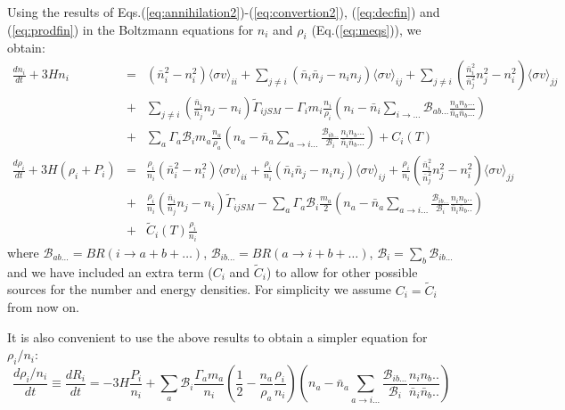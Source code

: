 \documentclass[preprint,notoc]{JHEP3}
\def\to{\rightarrow}
\def\to{\rightarrow}
\newcommand\Drv[2]{\frac{d #1}{d #2}}
\begin{document}
Using the results of Eqs.(\ref{eq:annihilation2})-(\ref{eq:convertion2}), (\ref{eq:decfin}) and
(\ref{eq:prodfin}) in the Boltzmann equations for $n_i$ and $\rho_i$
(Eq.(\ref{eq:meqs})), we obtain:
\begin{eqnarray}
\Drv{n_i}{t} + 3H n_i  & = &  \left( \bar{n}_i^2 - n_i^2 \right) \langle \sigma
v \rangle_{ii} + \sum_{j\neq i} \left( \bar{n}_i \bar{n}_j - n_i n_j \right) \langle \sigma
v \rangle_{ij} + \sum_{j\neq i} \left(\frac{\bar{n}_i^2}{\bar{n}_j^2} n_j^2  - n_i^2 \right) \langle \sigma v \rangle_{jj} \nonumber
\\
& + & \sum_{j\neq i} \left(\frac{\bar{n}_i}{\bar{n}_j} n_j  - n_i\right)  \tilde{\Gamma}_{ijSM} - \Gamma_i m_i \frac{n_i}{\rho_i}\left(n_i - \bar{n}_i \sum_{i\to\ldots}
\mathcal{B}_{ab\ldots} \frac{n_a n_b \ldots}{\bar{n}_a \bar{n}_b \ldots} \right)
\nonumber
\\
& + & \sum_a 
\Gamma_a \mathcal{B}_i m_a \frac{n_a}{\rho_a} \left(n_a - \bar{n}_a \sum_{a \to
i\ldots} \frac{\mathcal{B}_{ib\ldots}}{\mathcal{B}_{i}} \frac{n_i n_b \ldots}{\bar{n}_i \bar{n}_b \ldots} \right)  + C_{i}(T) \label{eq:nieq} \\
\Drv{\rho_i}{t} + 3H (\rho_i + P_i) & = & \frac{\rho_i}{n_i} \left( \bar{n}_i^2 - n_i^2 \right) \langle \sigma
v \rangle_{ii} + \frac{\rho_i}{n_i}  \left( \bar{n}_i \bar{n}_j - n_i n_j \right) \langle \sigma
v \rangle_{ij} + \frac{\rho_i}{n_i} \left(\frac{\bar{n}_i^2}{\bar{n}_j^2} n_j^2  - n_i^2 \right) \langle \sigma v \rangle_{jj} \nonumber
\\
& + &\frac{\rho_i}{n_i}  \left(\frac{\bar{n}_i}{\bar{n}_j} n_j  - n_i\right)  \tilde{\Gamma}_{ijSM} - \sum_a \Gamma_a  \mathcal{B}_i \frac{m_a}{2} \left( n_a -
 \bar{n}_a \sum_{a \to i\ldots}  \frac{\mathcal{B}_{ib\ldots}}{\mathcal{B}_{i}} \frac{n_i
 n_b..}{\bar{n}_i \bar{n}_b..} \right) \nonumber
\\
& + & \tilde{C}_{i}(T)
 \frac{\rho_i}{n_i}
\end{eqnarray}
where $\mathcal{B}_{ab\ldots} = BR(i \to a + b+ \ldots)$, $\mathcal{B}_{ib\ldots} =
BR(a \to i + b + \ldots)$, $\mathcal{B}_i = \sum_b \mathcal{B}_{ib\ldots}$ and
we have included an extra term ($C_i$ and $\tilde{C}_i$) to allow for other possible sources for the number and energy densities. 
For simplicity we assume $C_i = \tilde{C}_{i}$ from now on.


It is also convenient to use the above results to obtain a simpler equation for
$\rho_i/n_i$:
\begin{equation}
\Drv{\rho_i/n_i}{t} \equiv \Drv{R_i}{t} = -3 H \frac{P_i}{n_i} + \sum_{a}
\mathcal{B}_{i} \frac{\Gamma_a m_a}{n_i} \left( \frac{1}{2} - \frac{n_a}{\rho_a} \frac{\rho_i}{n_i} \right) \left(n_a -
\bar{n}_a \sum_{a \to i\ldots} \frac{\mathcal{B}_{ib\ldots}}{\mathcal{B}_{i}} \frac{n_i
 n_b..}{\bar{n}_i \bar{n}_b..}\right) \label{eq:Rieq}
\end{equation}
\end{document}
